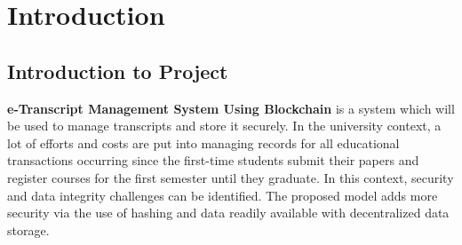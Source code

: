 \newpage
\section{Introduction}

\subsection{Introduction to Project}
\textbf{e-Transcript Management System Using Blockchain} is a system which will be used to manage transcripts and store it securely. In the university context, a lot of efforts and costs are put into managing records for all educational transactions occurring since the first-time students submit their papers and register courses
for the first semester until they graduate. In this context, security and data integrity challenges can be identified. The proposed model adds more security via the use of hashing and data readily available with decentralized data storage. 




